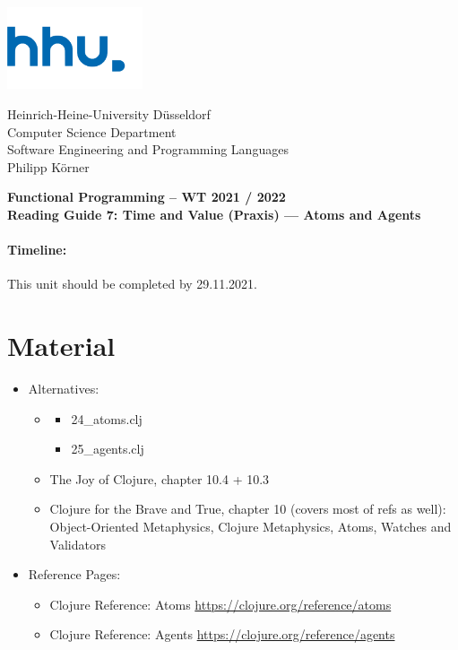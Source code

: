 \documentclass[11pt,a4paper]{article}
\begin{document}
\begin{minipage}[b]{\textwidth}
	\parbox[t]{5cm}{%
		\includegraphics[width=4cm]{unilogo}
		\hfill
	}
	\parbox[b]{11cm}{%
		Heinrich-Heine-University D\"usseldorf\\
		Computer Science Department\\
		Software Engineering and Programming Languages\\
		Philipp K\"orner
	}
\end{minipage}
\begin{center}
	\bf
	Functional Programming -- WT 2021 / 2022\\
	Reading Guide 7: Time and Value (Praxis) --- Atoms and Agents
\end{center}

\pagestyle{empty}

\paragraph{Timeline:} This unit should be completed by 29.11.2021.

\section{Material} 

\begin{itemize}
    \item Alternatives:
        \begin{itemize}
            \item \begin{itemize}
                \item 24\_atoms.clj
                \item 25\_agents.clj
            \end{itemize}
            \item The Joy of Clojure, chapter 10.4 + 10.3
            \item Clojure for the Brave and True, chapter 10 (covers most of refs as well): Object-Oriented Metaphysics, Clojure Metaphysics, Atoms, Watches and Validators
        \end{itemize}
    \item Reference Pages:
        \begin{itemize}
    \item Clojure Reference: Atoms \url{https://clojure.org/reference/atoms}
    \item Clojure Reference: Agents \url{https://clojure.org/reference/agents}
        \end{itemize}
\end{itemize}
\end{document}
